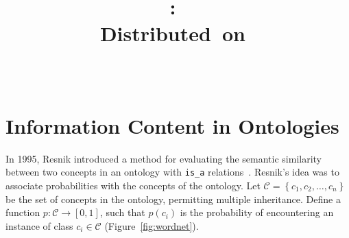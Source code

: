 \documentclass{article}
\title{
\vspace{2in}
\textmd{\textbf{\hmwkClass:\ \hmwkTitle}}\\
\normalsize\vspace{0.1in}\small{Distributed\ on\ \hmwkDueDate}\\
\vspace{0.1in}\large{\textit{\hmwkClassInstructor\ \hmwkClassTime}}
\vspace{3in}
}
\author{\textbf{\hmwkAuthorName}}
\date{} %
\newcommand{\predicate}[1]{\texttt{#1}}
\begin{document}
\maketitle


 
\section{Information Content in Ontologies} 
 
In 1995, Resnik introduced a method for evaluating the semantic 
similarity between two concepts in an ontology with \predicate{is\_a} 
relations~\cite{Resnik1995}. Resnik's idea was to associate 
probabilities with the concepts of the ontology. Let 
$\mathcal{C}=\left\{c_1,c_2,\ldots,c_n\right\}$ be the set of concepts 
in the ontology, permitting multiple inheritance. Define a function 
$p:\mathcal{C}\longrightarrow \left[ 0,1\right]$, such that $p(c_i)$ 
is the probability of encountering an instance of class $c_i\in 
\mathcal{C}$ (Figure~\ref{fig:wordnet}).  
 
 
 
\end{document}
